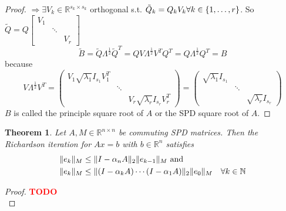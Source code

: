 \documentclass[12pt]{article}
\newcounter{lecture}
\newtheorem{theorem}{Theorem}[lecture]
\theoremstyle{definition}
\theoremstyle{remark}
\numberwithin{equation}{section}
\newcommand{\R}{\mathbb{R}}
\newcommand{\N}{\mathbb{N}}
\newcommand{\TODO}[1][]{\textcolor{red}{\textbf{TODO\ifblank{#1}{}{:\ }#1}}\\}
\DeclarePairedDelimiter{\norm}{\lVert}{\rVert}
\DeclarePairedDelimiter{\set}{\{}{\}}
\begin{document}
\begin{proof}
  $\Rightarrow \exists V_k \in \R^{s_k \times s_k}$ orthogonal s.t. $\tilde{Q}_k = Q_k V_k \forall k \in \set{1,\ldots,r}$. So $\tilde{Q} = Q
  \begin{bmatrix}
    V_1 & & \\
    & \ddots & \\
    & & V_r
  \end{bmatrix}$
  \begin{equation*}
    \tilde{B} = \tilde{Q} \Lambda^{\frac{1}{2}} \tilde{Q}^T = Q V \Lambda^{\frac{1}{2}} V^T Q^T = Q \Lambda^{\frac{1}{2}} Q^T = B
  \end{equation*}
  because
  \begin{equation*}
    V \Lambda^{\frac{1}{2}} V^T =
    \begin{pmatrix}
      V_1 \sqrt{ \lambda_1 } I_{s_1} V_1^T & & \\
      & \ddots & \\
      & & V_r \sqrt{ \lambda_r } I_{s_r} V_r^T
    \end{pmatrix} =
    \begin{pmatrix}
      \sqrt{\lambda_1} I_{s_1} & & \\
      & \ddots & \\
      & & \sqrt{\lambda_r} I_{s_r}
    \end{pmatrix}
  \end{equation*}
  $B$ is called the principle square root of $A$ or the SPD square root of $A$.
\end{proof}
\begin{theorem}
  \label{thm:richardson-error}
  Let $A, M \in \R^{n\times n}$ be commuting SPD matrices. Then the Richardson iteration for $Ax = b$ with $b \in \R^n$ satisfies
  \begin{align*}
    \norm{e_k}_M &\leq \norm{I - \alpha_n A}_2 \norm{e_{k-1}}_M \text{ and} \\
    \norm{e_k}_M &\leq \norm{(I-\alpha_k A)\cdots (I-\alpha_1 A)}_2 \norm{e_0}_M \quad \forall k \in \N
  \end{align*}
\end{theorem}
\begin{proof}
  \TODO[]
\end{proof}
\end{document}
